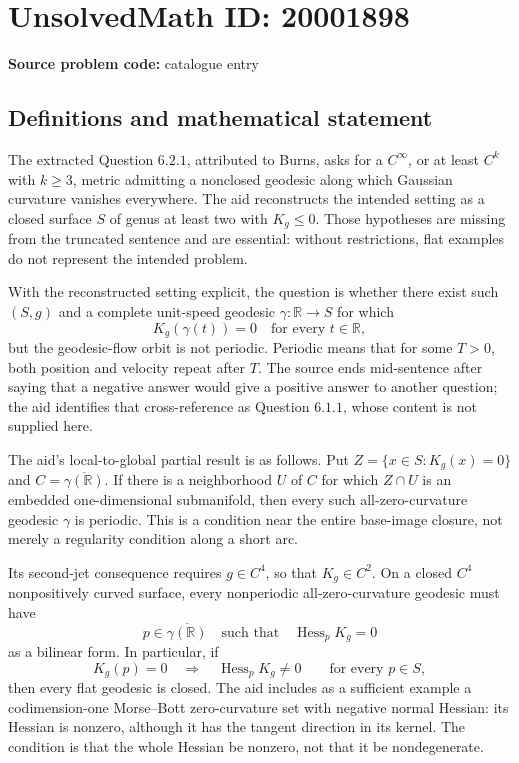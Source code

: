 \documentclass[11pt]{article}
\newcommand{\R}{\mathbb{R}}
\begin{document}
\section*{UnsolvedMath ID: 20001898}
\textbf{Source problem code:} catalogue entry
\subsection{Definitions and mathematical statement}
The extracted Question \(6.2.1\), attributed to Burns, asks for a \(C^\infty\), or at least \(C^k\) with \(k\geq3\), metric admitting a nonclosed geodesic along which Gaussian curvature vanishes everywhere. The aid reconstructs the intended setting as a closed surface \(S\) of genus at least two with \(K_g\leq0\). Those hypotheses are missing from the truncated sentence and are essential: without restrictions, flat examples do not represent the intended problem.

With the reconstructed setting explicit, the question is whether there exist such \((S,g)\) and a complete unit-speed geodesic \(\gamma:\R\to S\) for which
\[
 K_g(\gamma(t))=0\quad\text{for every }t\in\R,
\]
but the geodesic-flow orbit is not periodic. Periodic means that for some \(T>0\), both position and velocity repeat after \(T\). The source ends mid-sentence after saying that a negative answer would give a positive answer to another question; the aid identifies that cross-reference as Question \(6.1.1\), whose content is not supplied here.

The aid's local-to-global partial result is as follows. Put \(Z=\{x\in S:K_g(x)=0\}\) and \(C=\overline{\gamma(\R)}\). If there is a neighborhood \(U\) of \(C\) for which \(Z\cap U\) is an embedded one-dimensional submanifold, then every such all-zero-curvature geodesic \(\gamma\) is periodic. This is a condition near the entire base-image closure, not merely a regularity condition along a short arc.

Its second-jet consequence requires \(g\in C^4\), so that \(K_g\in C^2\). On a closed \(C^4\) nonpositively curved surface, every nonperiodic all-zero-curvature geodesic must have
\[
 p\in\overline{\gamma(\R)}\quad\text{such that}\quad
 \operatorname{Hess}_p K_g=0
\]
as a bilinear form. In particular, if
\[
 K_g(p)=0\quad\Longrightarrow\quad
 \operatorname{Hess}_pK_g\ne0
 \qquad\text{for every }p\in S,
\]
then every flat geodesic is closed. The aid includes as a sufficient example a codimension-one Morse--Bott zero-curvature set with negative normal Hessian: its Hessian is nonzero, although it has the tangent direction in its kernel. The condition is that the whole Hessian be nonzero, not that it be nondegenerate.
\end{document}
